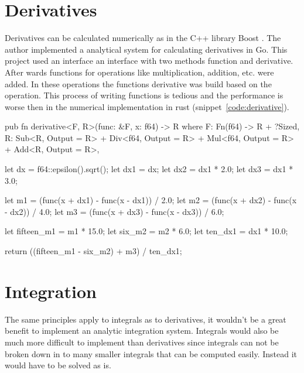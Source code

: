 \documentclass[11pt,DIV=10,final]{scrreprt} %
\providecommand{\rustinline}{\lstinline[language=Rust,basicstyle=\ttfamily,keywordstyle=\color{blue},commentstyle=\color{brown}, literate={ä}{{\"a}}1 {à}{{\`a}}1 {ö}{{\"o}}1 {ü}{{\"u}}1 {è}{{\`e}}1 {é}{{\'e}}1]} % für Inline-C++ Code
\begin{document}
\section{Derivatives}
Derivatives can be calculated numerically as in the C++ library Boost \citep{boost:calculating-derivative}.
The author implemented a analytical system for calculating derivatives in Go. This project used an interface an interface with two methods function and derivative. After wards functions for operations like
multiplication, addition, etc. were added. In these operations the functions derivative was build based on the operation. This process of writing functions is tedious and the performance is worse then in
the numerical implementation in rust (snippet~\ref{code:derivative}).

\begin{minipage}{\textwidth}
\begin{rustcode}[label=code:derivative, caption={
Rewrite of the C++ library Boost's implementation \citep{boost:calculating-derivative} of numerical differentiation for Rust.
\rustinline{f64::epsilon().sqrt()} is approximately $1.4901161\cdot 10^{-8}$.
\rustinline{f64::epsilon()} is the smallest double precision floating point number $\epsilon$ where $1 +
\epsilon \ne 1$. This value has been chosen for $dx$ because it is precise enough.
}]
pub fn derivative<F, R>(func: &F, x: f64) -> R
where
    F: Fn(f64) -> R + ?Sized,
    R: Sub<R, Output = R> + Div<f64, Output = R> + Mul<f64, Output = R> + Add<R, Output = R>,
{
    let dx = f64::epsilon().sqrt();
    let dx1 = dx;
    let dx2 = dx1 * 2.0;
    let dx3 = dx1 * 3.0;

    let m1 = (func(x + dx1) - func(x - dx1)) / 2.0;
    let m2 = (func(x + dx2) - func(x - dx2)) / 4.0;
    let m3 = (func(x + dx3) - func(x - dx3)) / 6.0;

    let fifteen_m1 = m1 * 15.0;
    let six_m2 = m2 * 6.0;
    let ten_dx1 = dx1 * 10.0;

    return ((fifteen_m1 - six_m2) + m3) / ten_dx1;
}
\end{rustcode}
\end{minipage}

\section{Integration}
The same principles apply to integrals as to derivatives, it wouldn't be a great benefit to
implement an analytic integration system. Integrals would also be much more difficult to
implement than derivatives since integrals can not be broken down in to many smaller
integrals that can be computed easily. Instead it would have to be solved as is.
\end{document}
